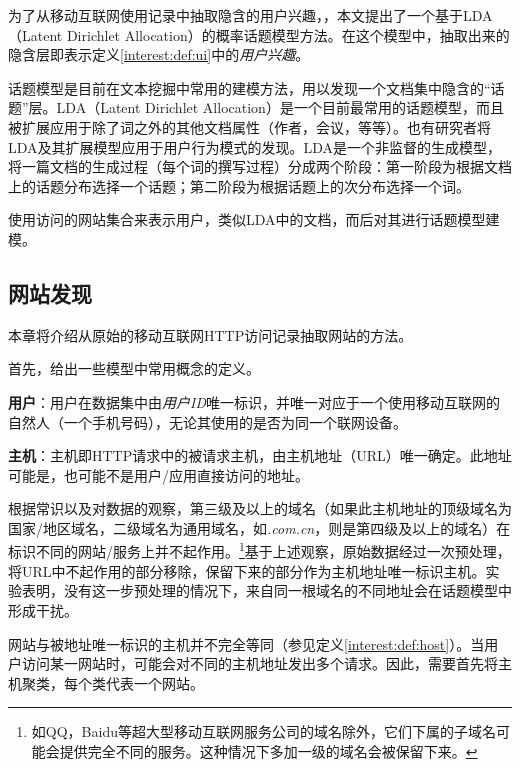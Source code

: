 为了从移动互联网使用记录中抽取隐含的用户兴趣，，本文提出了一个基于LDA（Latent Dirichlet Allocation）的概率话题模型方法。在这个模型中，抽取出来的隐含层即表示定义\ref{interest:def:ui}中的\textit{用户兴趣}。

话题模型是目前在文本挖掘中常用的建模方法，用以发现一个文档集中隐含的``话题''层。LDA（Latent Dirichlet Allocation）\cite{jmlr03blei}是一个目前最常用的话题模型，而且被扩展应用于除了词之外的其他文档属性（作者，会议，等等）\cite{kdd04steyvers}\cite{kdd08tang}\cite{kdd12tang}。也有研究者将LDA及其扩展模型应用于用户行为模式的发现\cite{tist11farrahi}。LDA是一个非监督的生成模型，将一篇文档的生成过程（每个词的撰写过程）分成两个阶段：第一阶段为根据文档上的话题分布选择一个话题；第二阶段为根据话题上的次分布选择一个词。

使用访问的网站集合来表示用户，类似LDA中的文档，而后对其进行话题模型建模。

\subsection{网站发现}
\label{interest:sec:website}
本章将介绍从原始的移动互联网HTTP访问记录抽取网站的方法。

首先，给出一些模型中常用概念的定义。

\begin{definition}
\textbf{用户}：用户在数据集中由\textit{用户ID}唯一标识，并唯一对应于一个使用移动互联网的自然人（一个手机号码），无论其使用的是否为同一个联网设备。
\end{definition}

\begin{definition}
\label{interest:def:host}
\textbf{主机}：主机即HTTP请求中的被请求主机，由主机地址（URL）唯一确定。此地址可能是，也可能不是用户/应用直接访问的地址。
\end{definition}

根据常识以及对数据的观察，第三级及以上的域名（如果此主机地址的顶级域名为国家/地区域名，二级域名为通用域名，如\textit{.com.cn}，则是第四级及以上的域名）在标识不同的网站/服务上并不起作用。\footnote{如QQ，Baidu等超大型移动互联网服务公司的域名除外，它们下属的子域名可能会提供完全不同的服务。这种情况下多加一级的域名会被保留下来。}基于上述观察，原始数据经过一次预处理，将URL中不起作用的部分移除，保留下来的部分作为主机地址唯一标识主机。实验表明，没有这一步预处理的情况下，来自同一根域名的不同地址会在话题模型中形成干扰。

网站与被地址唯一标识的主机并不完全等同（参见定义\ref{interest:def:host}）。当用户访问某一网站时，可能会对不同的主机地址发出多个请求。因此，需要首先将主机聚类，每个类代表一个网站。

